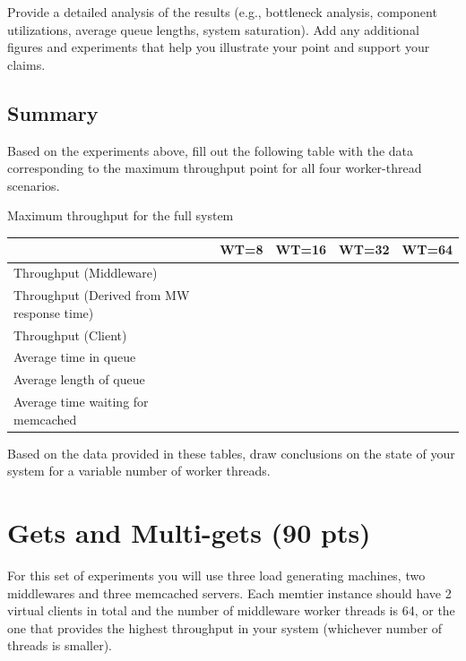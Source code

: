 \documentclass[11pt,a4paper]{article}
\begin{document}
Provide a detailed analysis of the results (e.g., bottleneck analysis, component utilizations, average queue lengths, system saturation). Add any additional figures and experiments that help you illustrate your point and support your claims.

\subsection{Summary}

Based on the experiments above, fill out the following table with the data corresponding to the maximum throughput point for all four worker-thread scenarios.

\begin{center}
	{Maximum throughput for the full system}
	\begin{tabular}{|l|p{1.5cm}|p{1.5cm}|p{1.5cm}|p{1.5cm}|}
		\hline                                            & WT=8 & WT=16 & WT=32 & WT=64 \\
		\hline Throughput (Middleware)                    &      &       &       &       \\
		\hline Throughput (Derived from MW response time) &      &       &       &       \\
		\hline Throughput (Client)                        &      &       &       &       \\
		\hline Average time in queue                      &      &       &       &       \\
		\hline Average length of queue                    &      &       &       &       \\
		\hline Average time waiting for memcached         &      &       &       &       \\
		\hline
	\end{tabular}
\end{center}

Based on the data provided in these tables, draw conclusions on the state of your system for a variable number of worker threads.

\section{Gets and Multi-gets (90 pts)}

For this set of experiments you will use three load generating machines, two middlewares and three memcached servers. Each memtier instance should have 2 virtual clients in total and the number of middleware worker threads is 64, or the one that provides the highest throughput in your system (whichever number of threads is smaller).
\end{document}

